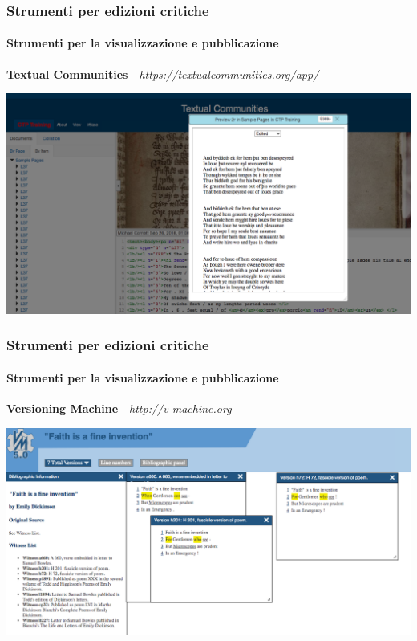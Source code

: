 \begin{frame}
    \frametitle{Strumenti per edizioni critiche}
    \framesubtitle{Strumenti per la visualizzazione e pubblicazione}
	\addtocounter{nframe}{1}
    \begin{center}
        \textbf{Textual Communities} - \textit{\url{https://textualcommunities.org/app/}}
    \end{center}
    \begin{center}
        \includegraphics[width=.95\textwidth]{imgs/textualcommunities.png}
	\end{center}
\end{frame}

\begin{frame}
    \frametitle{Strumenti per edizioni critiche}
    \framesubtitle{Strumenti per la visualizzazione e pubblicazione}
	\addtocounter{nframe}{1}
    \begin{center}
        \textbf{Versioning Machine} - \textit{\url{http://v-machine.org}}
    \end{center}
    \begin{center}
        \includegraphics[width=.95\textwidth]{imgs/v-machine.png}
	\end{center}
\end{frame}

